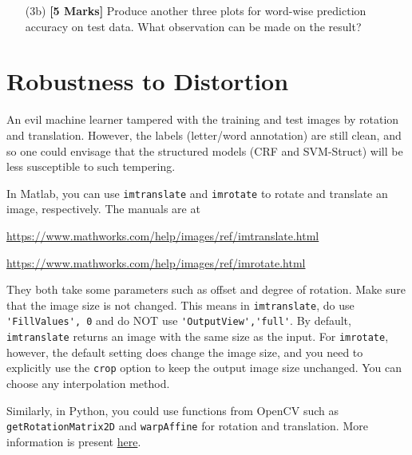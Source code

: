 \documentclass[11pt]{report}
\begin{document}
\begin{itemize}
		\item[(3b)] {\bf [5 Marks]} Produce another three plots for word-wise prediction accuracy on test data.  What observation can be made on the result?
	\end{itemize}
	
	
	\section{Robustness to Distortion}
	
	An evil machine learner tampered with the training and test images by rotation and translation.
	However, the labels (letter/word annotation) are still clean, and so
	one could envisage that the structured models (CRF and SVM-Struct) will be less susceptible to such tempering.
	
	In Matlab, you can use \verb#imtranslate# and \verb#imrotate# to rotate and translate an image, respectively.
	The manuals are at
		
	\href{https://www.mathworks.com/help/images/ref/imtranslate.html}{https://www.mathworks.com/help/images/ref/imtranslate.html}
	
	\href{https://www.mathworks.com/help/images/ref/imrotate.html}{https://www.mathworks.com/help/images/ref/imrotate.html}
	
	They both take some parameters such as offset and degree of rotation.
	Make sure that the image size is not changed. 
	This means in \verb#imtranslate#, 
	do use \verb#'FillValues', 0# and do NOT use \verb#'OutputView','full'#.
	By default, \verb#imtranslate# returns an image with the same size as the input.
	For \verb#imrotate#, however, the default setting does change the image size, and you need to explicitly use the \verb#crop# option to keep the output image size unchanged.
	You can choose any interpolation method.
	
	Similarly, in Python, you could use functions from OpenCV such as
	\texttt{getRotationMatrix2D} and \texttt{warpAffine} for rotation and
	translation. More information is present \href{https://opencv-python-tutroals.readthedocs.io/en/latest/py\_tutorials/py\_imgproc/py\_geometric\_transformations/py\_geometric\_transformations.html}{here}.
	
\end{document}
